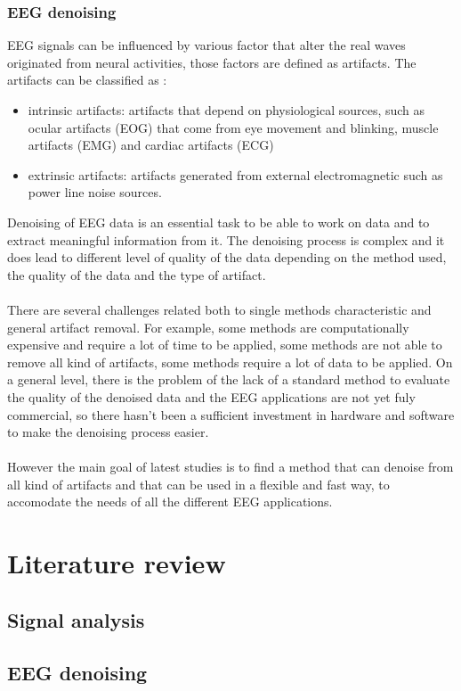 \documentclass[a4paper]{sapthesis}
\begin{document}
\subsection{EEG denoising}
EEG signals can be influenced by various factor that alter the real waves 
originated from neural activities, those factors are defined as artifacts. 
The artifacts can be classified as \cite{EEG artifact}: 
\begin{itemize}
    \item intrinsic artifacts:
    artifacts that depend on physiological sources, such as ocular artifacts (EOG)
    that come from eye movement and blinking, muscle artifacts (EMG) and
     cardiac artifacts (ECG)
    \item extrinsic artifacts: artifacts generated from external electromagnetic 
    such as power line noise
    sources.
\end{itemize}
Denoising of EEG data is an essential task to be able to work on data and to
extract meaningful information from it. The denoising process is complex and
it does lead to different level of quality of the data depending on the 
method used, the quality of the data and the type of artifact.\\ \\
There are several challenges \cite{denoising challenges} related both 
to single methods characteristic and general artifact removal.
For example, some methods are computationally expensive and require a lot
of time to be applied, some methods are not able to remove all kind of
artifacts, some methods require a lot of data to be applied. On a general
level, there is the problem of the lack of a standard method to evaluate
the quality of the denoised data and the EEG applications are not 
yet fuly commercial, so there hasn't been a sufficient investment in
hardware and software to make the denoising process easier.\\ \\
However the main goal of latest studies is to find a method that can
denoise from all kind of artifacts and that can be used in a flexible
and fast way, to accomodate the needs of all the different EEG applications.
\chapter{Literature review}
\section{Signal analysis}
\section{EEG denoising}
\end{document}

